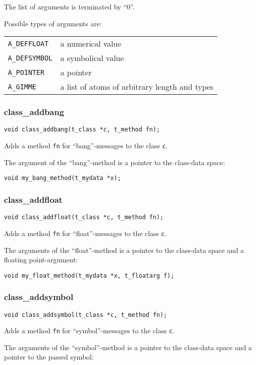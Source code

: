 \documentclass[12pt, a4paper,english,titlepage]{article}
\begin{document}
\begin{appendix}
The list of arguments is terminated by ``0''.


Possible types of arguments are:

\begin{tabular}{l|l}
\verb+A_DEFFLOAT+ & a numerical value \\
\verb+A_DEFSYMBOL+ & a symbolical value \\
\verb+A_POINTER+ & a pointer \\
\verb+A_GIMME+ & a list of atoms of arbitrary length and types \\
\end{tabular}

\subsubsection{class\_addbang}
\begin{verbatim}
void class_addbang(t_class *c, t_method fn);
\end{verbatim}
Adds a method \verb+fn+ for ``bang''-messages to the class \verb+c+.

The argument of the ``bang''-method is a pointer to the class-data space:

\verb+void my_bang_method(t_mydata *x);+

\subsubsection{class\_addfloat}
\begin{verbatim}
void class_addfloat(t_class *c, t_method fn);
\end{verbatim}
Adds a method \verb+fn+ for ``float''-messages to the class \verb+c+.

The arguments of the ``float''-method is a pointer to the class-data space and
a floating point-argument:

\verb+void my_float_method(t_mydata *x, t_floatarg f);+

\subsubsection{class\_addsymbol}
\begin{verbatim}
void class_addsymbol(t_class *c, t_method fn);
\end{verbatim}
Adds a method \verb+fn+ for ``symbol''-messages to the class \verb+c+.

The arguments of the ``symbol''-method is a pointer to the class-data space and
a pointer to the passed symbol:


\end{appendix}
\end{document}
